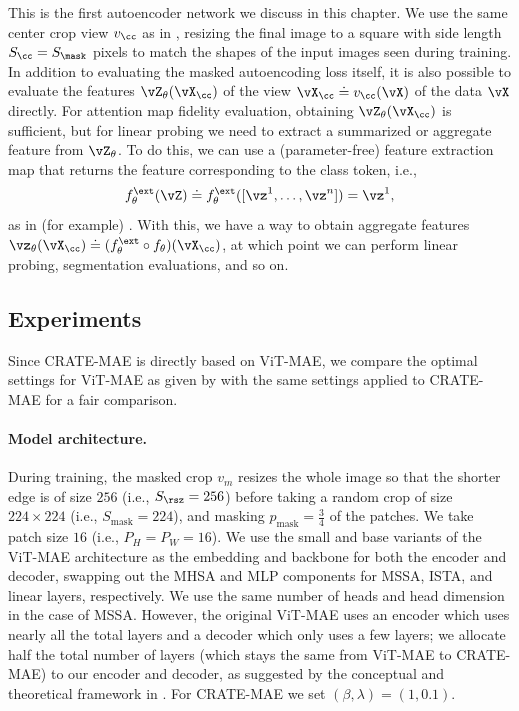 \documentclass[../../book-main.tex]{subfiles}
\begin{document}
This is the first autoencoder network we discuss in this chapter. We
use the same center crop view \(v_{\cc}\) as in
,
resizing the final image to a square with side length \(S_{\cc} =
S_{\mask}\) pixels to match the shapes of the input images seen during training.
In addition to evaluating the masked autoencoding loss itself, it is
also possible to evaluate the features \(\vZ_{\theta}(\vX_{\cc})\) of
the view \(\vX_{\cc} \doteq v_{\cc}(\vX)\) of the data \(\vX\)
directly. For attention map fidelity evaluation, obtaining
\(\vZ_{\theta}(\vX_{\cc})\) is sufficient, but for linear probing we
need to extract a summarized or aggregate feature from
\(\vZ_{\theta}\). To do this, we can use a (parameter-free) feature
extraction map that returns the feature corresponding to the class token, i.e.,
\begin{equation}
f_{\theta}^{\ext}(\vZ) \doteq f_{\theta}^{\ext}([\vz^{1}, \dots,
\vz^{n}]) = \vz^{1} ,
\end{equation}
as in (for example)
.
With this, we have a way to obtain aggregate features
\(\vz_{\theta}(\vX_{\cc}) \doteq (f_{\theta}^{\ext} \circ
f_{\theta})(\vX_{\cc})\), at which point we can perform linear
probing, segmentation evaluations, and so on.

\subsection{Experiments}\label{sub:image_completion_experiments}

Since CRATE-MAE is directly based on ViT-MAE, we compare the optimal
settings for ViT-MAE as given by \citet{he2022masked} with the same
settings applied to CRATE-MAE for a fair comparison.

\paragraph{Model architecture.} During training, the masked crop
\(v_{m}\) resizes the whole image so that the shorter edge is of size
\(256\) (i.e., \(S_{\rsz} = 256\)) before taking a random crop of
size \(224 \times 224\) (i.e., \(S_{\mathrm{mask}} = 224\)), and
masking \(p_{\mathrm{mask}} = \frac{3}{4}\) of the patches. We take
patch size \(16\) (i.e., \(P_{H} = P_{W} = 16\)). We use the small
and base variants of the ViT-MAE architecture as the embedding and
backbone for both the encoder and decoder, swapping out the MHSA and
MLP components for MSSA, ISTA, and linear layers, respectively. We
use the same number of heads and head dimension in the case of MSSA.
However, the original ViT-MAE uses an encoder which uses nearly all
the total layers and a decoder which only uses a few layers; we
allocate half the total number of layers (which stays the same from
ViT-MAE to CRATE-MAE) to our encoder and decoder, as suggested by the
conceptual and theoretical framework in
. For
CRATE-MAE we set \((\beta, \lambda) = (1, 0.1)\).
\end{document}
